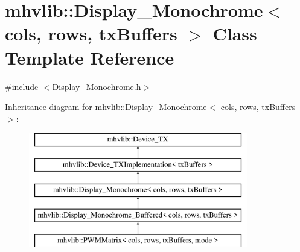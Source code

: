 \hypertarget{classmhvlib_1_1_display___monochrome}{\section{mhvlib\-:\-:Display\-\_\-\-Monochrome$<$ cols, rows, tx\-Buffers $>$ Class Template Reference}
\label{classmhvlib_1_1_display___monochrome}
}


{\ttfamily \#include $<$Display\-\_\-\-Monochrome.\-h$>$}

Inheritance diagram for mhvlib\-:\-:Display\-\_\-\-Monochrome$<$ cols, rows, tx\-Buffers $>$\-:\begin{figure}[H]
\begin{center}
\leavevmode
\includegraphics[height=5.000000cm]{classmhvlib_1_1_display___monochrome}
\end{center}
\end{figure}

